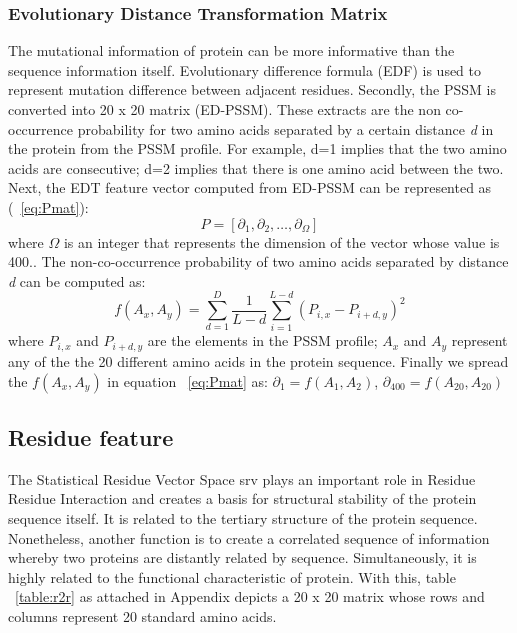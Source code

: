   \subsubsection{Evolutionary Distance Transformation Matrix}
  The mutational information of protein can be more informative than the sequence information itself\cite{Zhang2014}. Evolutionary difference formula (EDF) is used to represent mutation difference between adjacent residues. Secondly, the PSSM is converted into 20 x 20 matrix (ED-PSSM). These extracts are the non co-occurrence probability for two amino acids separated by a certain distance \textit{d} in the protein from the PSSM profile. For example, d=1 implies that the two amino acids are consecutive; d=2 implies that there is one amino acid between the two. Next, the EDT feature vector computed from ED-PSSM can be represented as (~\ref{eq:Pmat}): 
  \begin{equation}
    \label{eq:Pmat}
    P = [ \partial_1 ,\partial_2, \dots, \partial_\Omega]
  \end{equation}
  where $\Omega$ is an integer that represents the dimension of the vector whose value is 400.. The non-co-occurrence probability of two amino acids separated by distance \textit{d} can be computed as:
  \begin{equation}
    f(A_x,A_y) = \sum_{d=1}^{D} \frac{1}{L-d} \sum_{i=1}^{L-d} (P_{i,x} - P_{i+d,y})^2
    \label{eq:edt}
  \end{equation}
  where $P_{i,x}$ and $P_{i+d,y}$ are the elements in the PSSM profile; $A_x$ and $A_y$ represent any of the the 20 different amino acids in the protein sequence. Finally we spread the $f(A_x,A_y)$ in equation ~\ref{eq:Pmat} as:
  $ \partial_1 = f(A_1,A_2) $, 
  $ \partial_{400} = f(A_{20}, A_{20}) $
  
  
  \subsection{Residue feature} 
  The Statistical Residue Vector Space \acrshort{srv} \cite{Wong2018} plays an important role in Residue Residue Interaction and creates a basis for structural stability of the protein sequence itself. It is related to the tertiary structure of the protein sequence. Nonetheless, another function is to create a correlated sequence of information whereby two proteins are distantly related by sequence. Simultaneously, it is highly related to the functional characteristic of protein.  With this, table ~\ref{table:r2r} as attached in Appendix depicts a 20 x 20 matrix whose rows and columns represent 20 standard amino acids.
  
